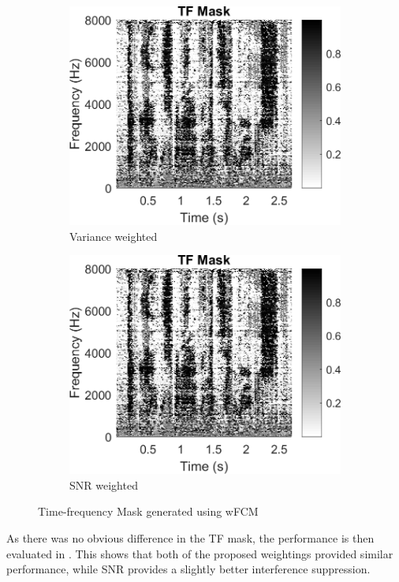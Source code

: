 \documentclass[a4paper,twoside,12pt,hidelinks]{article}
\begin{document}
\begin{figure}[H]
\centering
\begin{subfigure}[H]{0.49\textwidth}
\includegraphics[width=\textwidth]{maskwFCM}
\caption{Variance weighted}
\end{subfigure}
\begin{subfigure}[H]{0.49\textwidth}
\includegraphics[width=\textwidth]{maskwFCM_SNR_}
\caption{SNR weighted}
\end{subfigure}
\caption{Time-frequency Mask generated using wFCM}
\label{fig:wfcm}
\end{figure}
As there was no obvious difference in the TF mask, the performance is then evaluated in . This shows that both of the proposed weightings provided similar performance, while SNR provides a slightly better interference suppression.
\end{document}
